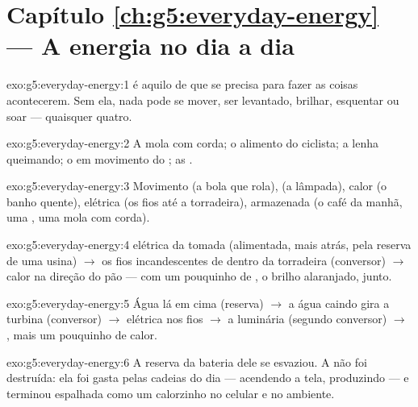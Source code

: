 \section*{Capítulo \ref{ch:g5:everyday-energy} --- A energia no dia a dia}

\begin{solution}{exo:g5:everyday-energy:1}
 é aquilo de que se precisa para fazer as coisas acontecerem.
Sem ela, nada pode se mover, ser levantado, brilhar, esquentar ou
soar --- quaisquer quatro.
\end{solution}

\begin{solution}{exo:g5:everyday-energy:2}
A mola com corda; o alimento do ciclista; a lenha queimando; o  em
movimento do ; as .
\end{solution}

\begin{solution}{exo:g5:everyday-energy:3}
Movimento (a bola que rola),  (a lâmpada), calor (o banho quente),
elétrica (os fios até a torradeira), armazenada (o café da manhã, uma
, uma mola com corda).
\end{solution}

\begin{solution}{exo:g5:everyday-energy:4}
 elétrica da tomada (alimentada, mais atrás, pela reserva de
uma usina) $\to$ os fios incandescentes de dentro da torradeira
(conversor) $\to$ calor na direção do pão --- com um pouquinho de
, o brilho alaranjado, junto.
\end{solution}

\begin{solution}{exo:g5:everyday-energy:5}
Água lá em cima (reserva) $\to$ a água caindo gira a turbina
(conversor) $\to$  elétrica nos fios $\to$ a luminária
(segundo conversor) $\to$ , mais um pouquinho de calor.
\end{solution}

\begin{solution}{exo:g5:everyday-energy:6}
A reserva da bateria dele se esvaziou. A  não foi destruída:
ela foi gasta pelas cadeias do dia --- acendendo a tela, produzindo
 --- e terminou espalhada como um calorzinho no celular e no
ambiente.
\end{solution}

